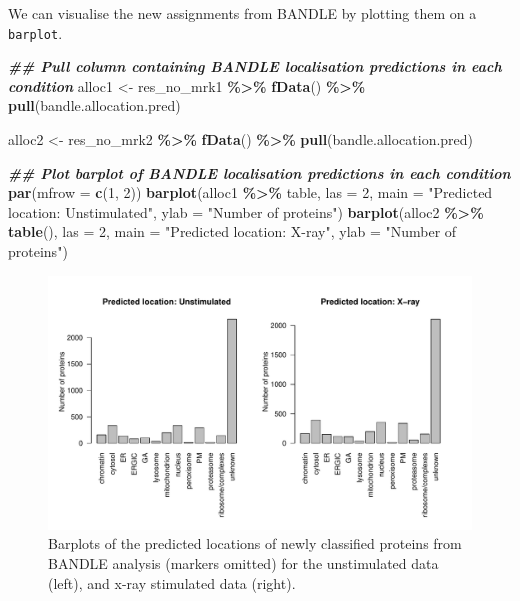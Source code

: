 \documentclass[9pt,a4paper,]{extarticle}
\newenvironment{Shaded}{\begin{snugshade}}{\end{snugshade}}
\newcommand{\AttributeTok}[1]{\textcolor[rgb]{0.13,0.29,0.53}{#1}}
\newcommand{\DecValTok}[1]{\textcolor[rgb]{0.00,0.00,0.81}{#1}}
\newcommand{\DocumentationTok}[1]{\textcolor[rgb]{0.56,0.35,0.01}{\textbf{\textit{#1}}}}
\newcommand{\FunctionTok}[1]{\textcolor[rgb]{0.13,0.29,0.53}{\textbf{#1}}}
\newcommand{\NormalTok}[1]{#1}
\newcommand{\OtherTok}[1]{\textcolor[rgb]{0.56,0.35,0.01}{#1}}
\newcommand{\SpecialCharTok}[1]{\textcolor[rgb]{0.81,0.36,0.00}{\textbf{#1}}}
\newcommand{\StringTok}[1]{\textcolor[rgb]{0.31,0.60,0.02}{#1}}
\begin{document}
We can visualise the new assignments from BANDLE by plotting them on a \texttt{barplot}.

\begin{Shaded}
\begin{Highlighting}[]
\DocumentationTok{\#\# Pull column containing BANDLE localisation predictions in each condition}
\NormalTok{alloc1 }\OtherTok{\textless{}{-}}\NormalTok{ res\_no\_mrk1 }\SpecialCharTok{\%\textgreater{}\%}
  \FunctionTok{fData}\NormalTok{() }\SpecialCharTok{\%\textgreater{}\%}
  \FunctionTok{pull}\NormalTok{(bandle.allocation.pred)}
  
\NormalTok{alloc2 }\OtherTok{\textless{}{-}}\NormalTok{ res\_no\_mrk2 }\SpecialCharTok{\%\textgreater{}\%}
  \FunctionTok{fData}\NormalTok{() }\SpecialCharTok{\%\textgreater{}\%}
  \FunctionTok{pull}\NormalTok{(bandle.allocation.pred)}

\DocumentationTok{\#\# Plot barplot of BANDLE localisation predictions in each condition}
\FunctionTok{par}\NormalTok{(}\AttributeTok{mfrow =} \FunctionTok{c}\NormalTok{(}\DecValTok{1}\NormalTok{, }\DecValTok{2}\NormalTok{))}
\FunctionTok{barplot}\NormalTok{(alloc1 }\SpecialCharTok{\%\textgreater{}\%}\NormalTok{ table, }
        \AttributeTok{las =} \DecValTok{2}\NormalTok{, }\AttributeTok{main =} \StringTok{"Predicted location: Unstimulated"}\NormalTok{,}
        \AttributeTok{ylab =} \StringTok{"Number of proteins"}\NormalTok{)}
\FunctionTok{barplot}\NormalTok{(alloc2 }\SpecialCharTok{\%\textgreater{}\%} \FunctionTok{table}\NormalTok{(),}
        \AttributeTok{las =} \DecValTok{2}\NormalTok{, }\AttributeTok{main =} \StringTok{"Predicted location: X{-}ray"}\NormalTok{,}
        \AttributeTok{ylab =} \StringTok{"Number of proteins"}\NormalTok{)}
\end{Highlighting}
\end{Shaded}

\begin{figure}[H]

{\centering \includegraphics[width=0.9\linewidth,]{figs/bandle_classifications} 

}

\caption{Barplots of the predicted locations of newly classified proteins from BANDLE analysis (markers omitted) for the unstimulated data (left), and x-ray stimulated data (right).}\label{fig:bandle-boxplot}
\end{figure}
\end{document}

